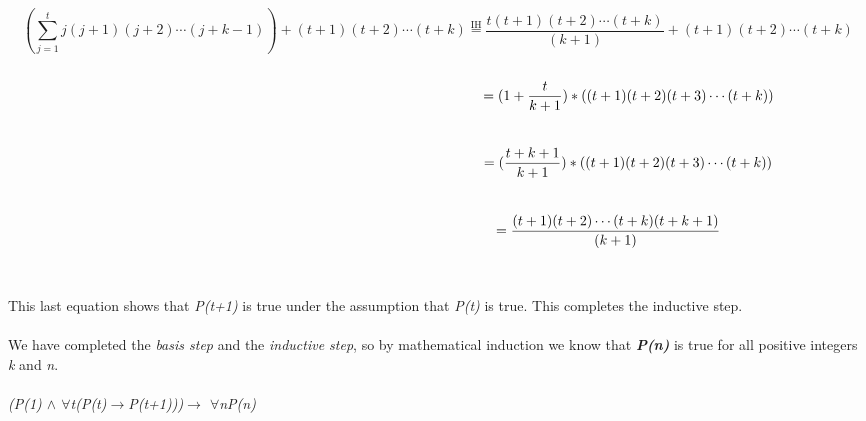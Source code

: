 \documentclass[12pt]{article}
\begin{document}
\[(\sum_{j=1}^{t}j(j + 1)(j + 2)\cdots (j+k-1)) + (t+1)(t+2)\cdots(t+k) \stackrel{\text{IH}}{=} \frac{t(t+1)(t+2)\cdots(t+k)}{(k+1)} +  (t+1)(t+2)\cdots(t+k)\]\\
\[\hspace*{9.6cm}= (1 + \frac{t}{k+1})*((t+1)(t+2)(t+3)\cdots(t+k))\]\\
\[\hspace*{9.6cm}= (\frac{t+k+1}{k+1})*((t+1)(t+2)(t+3)\cdots(t+k))\]\\
\[\hspace*{8.6cm}= \frac{(t+1)(t+2)\cdots(t+k)(t+k+1)}{(k+1)}\]\\
\vspace*{0.2cm}\\
This last equation shows that \textit{P(t+1)} is true under the assumption that \textit{P(t)} is true. This completes the inductive step.\\
\vspace*{0.2cm}\\
We have completed the \textit{basis step} and the \textit{inductive step}, so by mathematical induction we know that \textit{\textbf{P(n)}} is true for all positive integers \textit{k} and \textit{n}.\\
\vspace*{0.2cm}\\
\hspace*{3.4cm}\textit{(P(1) $\wedge$ $\forall$t(P(t)$\xrightarrow{}$P(t+1)))$\xrightarrow{}$ $\forall$nP(n)}\\
\end{document}
